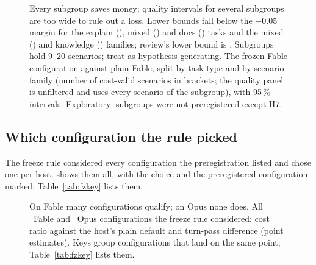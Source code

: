 \begin{figure}[htbp]
\centering
{}\par\smallskip

\caption{Every subgroup saves money; quality intervals for several subgroups are too wide to rule out a loss. Lower bounds fall below the $-$0.05 margin for the explain (\SubExplainTaskLow), mixed (\SubMixedTaskLow) and docs (\SubDocsTaskLow) tasks and the mixed (\SubMixedFamilyLow) and knowledge (\SubKnowledgeFamilyLow) families; review's lower bound is \SubReviewTaskLow. Subgroups hold 9--20 scenarios; treat as hypothesis-generating. The frozen Fable configuration against plain Fable, split by task type and by scenario family (number of
cost-valid scenarios in brackets; the quality panel is unfiltered and uses every scenario of the subgroup), with 95\,\%
intervals. Exploratory: subgroups were not preregistered except H7.}
\label{fig:subgroups}
\end{figure}

\subsection{Which configuration the rule picked}

The freeze rule considered every configuration the preregistration listed and chose one per host.  shows them all, with the choice and the preregistered configuration marked; Table~\ref{tab:fzkey} lists them.

\begin{figure}[htbp]
\centering
{}\par\smallskip
{}\par\medskip
{}
\caption{On Fable many configurations qualify; on Opus none does. All \FzFableN\ Fable and \FzOpusN\ Opus configurations the freeze rule considered: cost ratio against the
host's plain default and turn-pass difference (point estimates). Keys group configurations that land on the same
point; Table~\ref{tab:fzkey} lists them.}
\label{fig:fz}
\end{figure}

